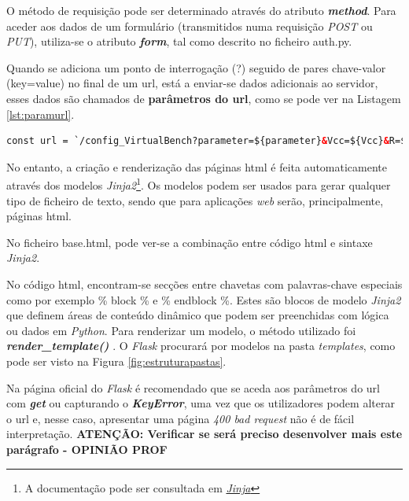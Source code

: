 O método de requisição pode ser determinado através do atributo \textit{\textbf{method}}. Para aceder aos dados de um formulário (transmitidos numa requisição \textit{POST} ou \textit{PUT}), utiliza-se o atributo \textit{\textbf{form}}, tal como descrito no ficheiro auth.py.

Quando se adiciona um ponto de interrogação (?) seguido de pares chave-valor (key=value) no final de um \acrshort{url}, está a enviar-se dados adicionais ao servidor, esses dados são chamados de \textbf{parâmetros do \acrshort{url}}, como se pode ver na Listagem \ref{lst:paramurl}.

\begin{minipage}{0.9\linewidth}
	\begin{lstlisting}[language=Html, caption=Exemplo argumentos passados ao servidor - ohm.html, label=lst:paramurl]
const url = `/config_VirtualBench?parameter=${parameter}&Vcc=${Vcc}&R=${Resistance}`;
\end{lstlisting}
\end{minipage}

No entanto, a criação e renderização das páginas \acrshort{html} é feita automaticamente através dos modelos \textit{Jinja2}\footnote{A documentação pode ser consultada em \href{https://jinja.palletsprojects.com/en/3.1.x/templates/}{\textit{Jinja}}}. Os modelos podem ser usados para gerar qualquer tipo de ficheiro de texto, sendo que para aplicações \textit{web} serão, principalmente, páginas \acrshort{html}.

No ficheiro base.html, pode ver-se a combinação entre código \acrshort{html} e sintaxe \textit{Jinja2}.

No código \acrshort{html}, encontram-se secções entre chavetas {} com palavras-chave especiais como por exemplo {\% block \%} e {\% endblock \%}. Estes são blocos de modelo \textit{Jinja2} que definem áreas de conteúdo dinâmico que podem ser preenchidas com lógica ou dados em \textit{Python}. Para renderizar um modelo, o método utilizado foi \textit{\textbf{render\_template()}} \cite{Flask}. O \textit{Flask} procurará por modelos na pasta \textit{templates}, como pode ser visto na Figura \ref{fig:estruturapastas}.

Na página oficial do \textit{Flask} é recomendado que se aceda aos parâmetros do \acrshort{url} com \textit{\textbf{get}} ou capturando o \textit{\textbf{KeyError}}, uma vez que os utilizadores podem alterar o \acrshort{url} e, nesse caso, apresentar uma página \textit{400 bad request} não é de fácil interpretação. \textbf{ATENÇÃO: Verificar se será preciso desenvolver mais este parágrafo - OPINIÃO PROF}

